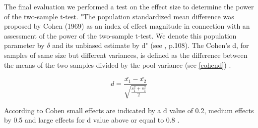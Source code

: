 The final evaluation we performed a test on the effect size to determine the power of the two-sample t-test. "The population standardized mean difference was proposed by Cohen (1969) as an index of effect magnitude in connection with an assessment of the power of the two-sample t-test. We denote this population parameter by $\delta$ and its unbiased estimate by d" (see \cite{hedges2014statistical}, p.108). The Cohen's d, for samples of same size but different variances, is defined as the difference between the means of the two samples divided by the pool variance (see \ref{cohend}) \cite{gravetter2016essentials}.

\begin{equation}\label{cohend}
d = \frac{\bar{x_{1}} - \bar{x_{2}}}{\sqrt{\frac{s_{1}^{2} + s_{1}^{2}}{2}}} 
\end{equation}

According to Cohen small effects are indicated by a d value of 0.2, medium effects by 0.5 and large effects for d value above or equal to 0.8 .










 